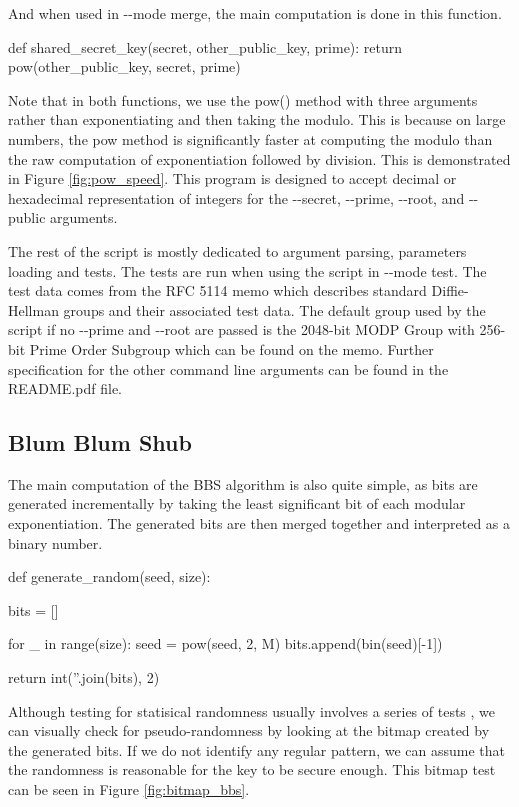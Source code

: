 \documentclass{article}
\begin{document}
And when used in -{}-mode merge, the main computation is done in this function.

\bigskip
\begin{python}
def shared_secret_key(secret, other_public_key, prime):
    return pow(other_public_key, secret, prime)
\end{python}
\bigskip

Note that in both functions, we use the pow() method with three arguments rather than exponentiating and then taking the modulo. This is because on large numbers, the pow method is significantly faster at computing the modulo than the raw computation of exponentiation followed by division. This is demonstrated in Figure \ref{fig:pow_speed}. 
This program is designed to accept decimal or hexadecimal representation of integers for the -{}-secret, -{}-prime, -{}-root, and -{}-public arguments.

The rest of the script is mostly dedicated to argument parsing, parameters loading and tests. The tests are run when using the script in -{}-mode test. The test data comes from the RFC 5114\cite{rfc5114} memo which describes standard Diffie-Hellman groups and their associated test data. The default group used by the script if no -{}-prime and -{}-root are passed is the 2048-bit MODP Group with 256-bit Prime Order Subgroup which can be found on the memo.
Further specification for the other command line arguments can be found in the README.pdf file.

\subsection{Blum Blum Shub}

The main computation of the BBS algorithm is also quite simple, as bits are generated incrementally by taking the least significant bit of each modular exponentiation. The generated bits are then merged together and interpreted as a binary number.

\bigskip
\begin{python}
def generate_random(seed, size):

    bits = []

    for _ in range(size):
        seed = pow(seed, 2, M)
        bits.append(bin(seed)[-1])
    
    return int(''.join(bits), 2)
\end{python}
\bigskip

Although testing for statisical randomness usually involves a series of tests \cite{rukhin2001statistical}, we can visually check for pseudo-randomness by looking at the bitmap created by the generated bits. If we do not identify any regular pattern, we can assume that the randomness is reasonable for the key to be secure enough. This bitmap test can be seen in Figure \ref{fig:bitmap_bbs}.
\end{document}
